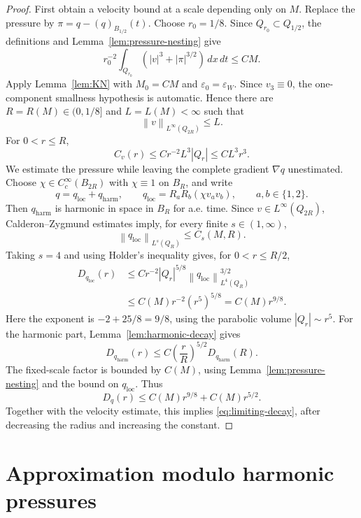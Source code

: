 \documentclass[pdflatex,sn-mathphys-num]{sn-jnl}
\numberwithin{equation}{section}
\theoremstyle{thmstyleone}
\theoremstyle{thmstylethree}
\newcommand{\eps}{\varepsilon}
\newcommand{\dxdt}{\,dx\,dt}
\newcommand{\norm}[2]{\left\|#1\right\|_{#2}}
\newcommand{\harm}{\mathrm{harm}}
\newcommand{\locp}{\mathrm{loc}}
\begin{document}
\begin{proof}
First obtain a velocity bound at a scale depending only on \(M\).  Replace the pressure by \(\pi=q-(q)_{B_{1/2}}(t)\).  Choose \(r_0=1/8\).  Since \(Q_{r_0}\subset Q_{1/2}\), the definitions and Lemma~\ref{lem:pressure-nesting} give
\[
        r_0^{-2}\int_{Q_{r_0}}(|v|^3+|\pi|^{3/2})\dxdt\le CM.
\]
Apply Lemma~\ref{lem:KN} with \(M_0=CM\) and \(\eps_0=\eps_W\).  Since \(v_3\equiv0\), the one-component smallness hypothesis is automatic.  Hence there are \(R=R(M)\in(0,1/8]\) and \(L=L(M)<\infty\) such that
\begin{equation}
        \norm{v}{L^\infty(Q_{2R})}\le L.
        \label{eq:limiting-Linfty}
\end{equation}
For \(0<r\le R\),
\[
        C_v(r)\le Cr^{-2}L^3|Q_r|\le CL^3r^3.
\]
We estimate the pressure while leaving the complete gradient \(\nabla q\) unestimated.  Choose \(\chi\in C_c^\infty(B_{2R})\) with \(\chi\equiv1\) on \(B_R\), and write
\[
        q=q_{\locp}+q_{\harm},
        \qquad
        q_{\locp}=R_aR_b(\chi v_av_b),
        \qquad a,b\in\{1,2\}.
\]
Then \(q_{\harm}\) is harmonic in space in \(B_R\) for a.e. time.  Since \(v\in L^\infty(Q_{2R})\), Calderon--Zygmund estimates imply, for every finite \(s\in(1,\infty)\),
\[
        \norm{q_{\locp}}{L^s(Q_R)}\le C_s(M,R).
\]
Taking \(s=4\) and using Holder's inequality gives, for \(0<r\le R/2\),
\[
\begin{aligned}
        D_{q_{\locp}}(r)
        &\le Cr^{-2}|Q_r|^{5/8}\norm{q_{\locp}}{L^4(Q_R)}^{3/2}  \\
        &\le C(M)r^{-2}(r^5)^{5/8}
        =C(M)r^{9/8}.
\end{aligned}
\]
Here the exponent is \(-2+25/8=9/8\), using the parabolic volume \(|Q_r|\sim r^5\).
For the harmonic part, Lemma~\ref{lem:harmonic-decay} gives
\[
        D_{q_{\harm}}(r)
        \le C\left(\frac rR\right)^{5/2}D_{q_{\harm}}(R).
\]
The fixed-scale factor is bounded by \(C(M)\), using Lemma~\ref{lem:pressure-nesting} and the bound on \(q_{\locp}\).  Thus
\[
        D_q(r)\le C(M)r^{9/8}+C(M)r^{5/2}.
\]
Together with the velocity estimate, this implies \eqref{eq:limiting-decay}, after decreasing the radius and increasing the constant.
\end{proof}

\section{Approximation modulo harmonic pressures}
\label{sec:compactness}
\end{document}
